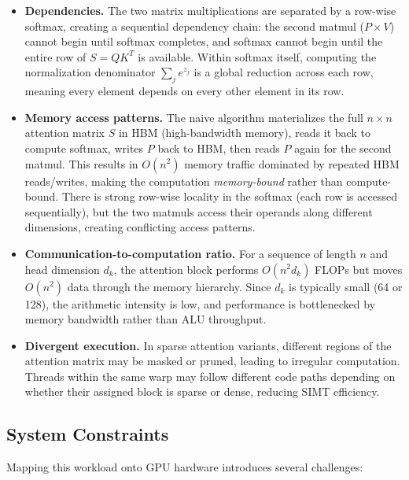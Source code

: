 \documentclass[11pt]{article}
\begin{document}
\begin{itemize}
    \item \textbf{Dependencies.} The two matrix multiplications are separated by a row-wise softmax, creating a sequential dependency chain: the second matmul ($P \times V$) cannot begin until softmax completes, and softmax cannot begin until the entire row of $S = QK^T$ is available. Within softmax itself, computing the normalization denominator $\sum_j e^{z_j}$ is a global reduction across each row, meaning every element depends on every other element in its row.

    \item \textbf{Memory access patterns.} The naive algorithm materializes the full $n \times n$ attention matrix $S$ in HBM (high-bandwidth memory), reads it back to compute softmax, writes $P$ back to HBM, then reads $P$ again for the second matmul. This results in $O(n^2)$ memory traffic dominated by repeated HBM reads/writes, making the computation \textit{memory-bound} rather than compute-bound. There is strong row-wise locality in the softmax (each row is accessed sequentially), but the two matmuls access their operands along different dimensions, creating conflicting access patterns.

    \item \textbf{Communication-to-computation ratio.} For a sequence of length $n$ and head dimension $d_k$, the attention block performs $O(n^2 d_k)$ FLOPs but moves $O(n^2)$ data through the memory hierarchy. Since $d_k$ is typically small (64 or 128), the arithmetic intensity is low, and performance is bottlenecked by memory bandwidth rather than ALU throughput.

    \item \textbf{Divergent execution.} In sparse attention variants, different regions of the attention matrix may be masked or pruned, leading to irregular computation. Threads within the same warp may follow different code paths depending on whether their assigned block is sparse or dense, reducing SIMT efficiency.
\end{itemize}

\subsection*{System Constraints}

Mapping this workload onto GPU hardware introduces several challenges:
\end{document}
